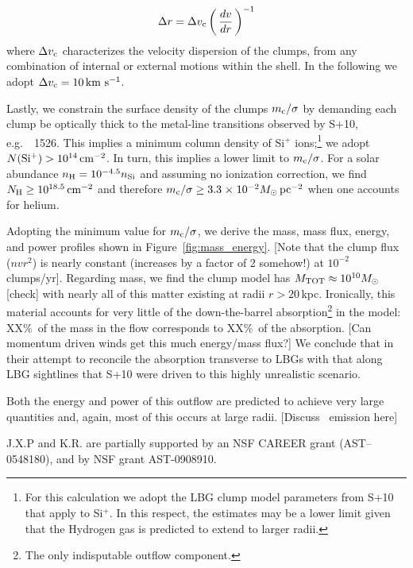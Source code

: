 \documentclass[12pt,preprint]{aastex}
\begin{document}
\begin{equation}
\Delta r = \Delta v_{\rm c} \left ( \, \frac{dv}{dr} \, \right )^{-1}
\end{equation}
where $\Delta v_{\rm c}$ characterizes the velocity dispersion of the
clumps, from any combination of internal or external motions within
the shell.  In the following we adopt $\Delta v_{\rm c} = 10 \, {\rm km~s^{-1}}$.

Lastly, we constrain the surface density of the clumps $m_{\rm
  c}/\sigma$ by demanding each clump be optically thick to the
metal-line transitions observed by S+10, e.g.\ ~1526.  
This implies a minimum column density of Si$^+$ ions;\footnote{For this
  calculation we adopt the LBG clump model parameters from S+10 that
  apply to Si$^+$.  In this respect, the estimates may be a lower
  limit given that the Hydrogen gas is predicted to extend to larger
  radii.} 
we adopt
${N({\rm Si^+})} > 10^{14} \, {\rm cm^{-2}}$.  In turn, this implies a lower limit to
$m_{\rm c}/\sigma$.  For a solar abundance $n_{\rm H} = 10^{-4.5}
n_{\rm Si}$ and assuming no ionization correction, we find $N_{\rm H}
\ge 10^{18.5} \, {\rm cm^{-2}}$ and therefore $m_{\rm c} / \sigma \ge 3.3
{\; \times \; 10^{-2}} M_\odot \, \rm pc^{-2}$ when one accounts for helium.

Adopting the minimum value for $m_{\rm c}/\sigma$,  we derive the mass,
mass flux, energy, and power profiles shown in
Figure~\ref{fig:mass_energy}.
[Note that the clump flux ($nvr^2$) is nearly constant (increases by a
factor of 2 somehow!) at $10^{-2}$ clumps/yr].
Regarding mass, we find the clump model has $M_{\rm TOT} \approx
10^{10} M_\odot$ [check] with nearly all of this matter existing at
radii $r>20$\,kpc.  Ironically, this material accounts for very little
of the down-the-barrel absorption\footnote{The only indisputable
  outflow component.} in the model: XX\%\ of the mass in the flow
corresponds to XX\%\ of the absorption.  
[Can momentum driven winds get this much energy/mass flux?]
We conclude that in their attempt to reconcile the absorption
transverse to LBGs with that along LBG sightlines that S+10 were
driven to this highly unrealistic scenario.

Both the energy and power of this outflow are predicted to achieve
very large quantities and, again, most of this occurs at large radii.
[Discuss \lya\ emission here]

\acknowledgments

J.X.P and K.R. are partially supported
by an NSF CAREER grant (AST--0548180), and 
by NSF grant AST-0908910.
\end{document}
